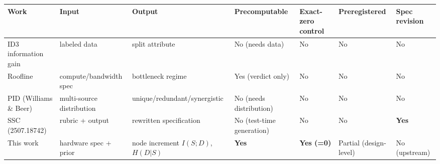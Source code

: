 \documentclass[10pt]{article}
\begin{document}
\begin{longtable}[]{@{}
  >{\raggedright\arraybackslash}p{}
  >{\raggedright\arraybackslash}p{}
  >{\raggedright\arraybackslash}p{}
  >{\raggedright\arraybackslash}p{}
  >{\raggedright\arraybackslash}p{}
  >{\raggedright\arraybackslash}p{}
  >{\raggedright\arraybackslash}p{}@{}}
\toprule\noalign{}
\begin{minipage}[b]{\linewidth}\raggedright
Work
\end{minipage} & \begin{minipage}[b]{\linewidth}\raggedright
Input
\end{minipage} & \begin{minipage}[b]{\linewidth}\raggedright
Output
\end{minipage} & \begin{minipage}[b]{\linewidth}\raggedright
Precomputable
\end{minipage} & \begin{minipage}[b]{\linewidth}\raggedright
Exact-zero control
\end{minipage} & \begin{minipage}[b]{\linewidth}\raggedright
Preregistered
\end{minipage} & \begin{minipage}[b]{\linewidth}\raggedright
Spec revision
\end{minipage} \\
\midrule\noalign{}
\endhead
\bottomrule\noalign{}
\endlastfoot
ID3 information gain & labeled data & split attribute & No (needs data) & No & No & No \\
Roofline \citep{roofline2009} & compute/bandwidth spec & bottleneck regime & Yes (verdict only) & No & No & No \\
PID (Williams \& Beer) & multi-source distribution & unique/redundant/synergistic & No (needs distribution) & No & No & No \\
SSC (2507.18742) & rubric + output & rewritten specification & No (test-time generation) & No & No & \textbf{Yes} \\
This work & hardware spec + prior & node increment $I(S;D)$, $H(D|S)$ & \textbf{Yes} & \textbf{Yes (=0)} & Partial (design-level) & No (upstream) \\
\end{longtable}
\end{document}

